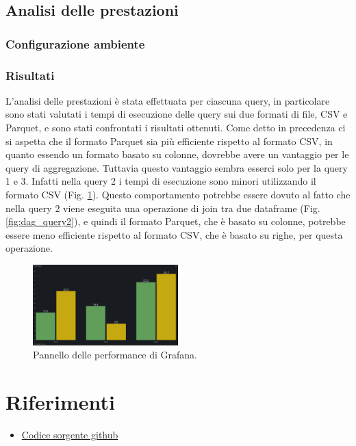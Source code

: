 \documentclass[conference]{IEEEtran}
\begin{document}
\subsection{Analisi delle prestazioni}
\subsubsection{Configurazione ambiente}
\subsubsection{Risultati}
L'analisi delle prestazioni è stata effettuata per ciascuna query, in particolare sono stati valutati i tempi di esecuzione delle query sui due formati di file, CSV e Parquet, e sono stati confrontati i risultati ottenuti.
Come detto in precedenza ci si aspetta che il formato Parquet sia più efficiente rispetto al formato CSV, in quanto essendo un formato basato su colonne, dovrebbe avere un vantaggio per le query di aggregazione.
Tuttavia questo vantaggio sembra esserci solo per la query 1 e 3. Infatti nella query 2 i tempi di esecuzione sono minori utilizzando il formato CSV (Fig. \ref{fig:performance_panel}).
Questo comportamento potrebbe essere dovuto al fatto che nella query 2 viene eseguita una operazione di join tra due dataframe (Fig. \ref{fig:dag_query2}), e quindi il formato Parquet, che è basato su colonne, potrebbe essere meno efficiente rispetto al formato CSV, che è basato su righe, per questa operazione.

\begin{figure}[H]
    \centerline{\includegraphics[width=0.5\textwidth]{res/performance_panel.png}}
    \caption{Pannello delle performance di Grafana.}
    \label{fig:performance_panel}
\end{figure}

\section{Riferimenti}
\begin{itemize}
    \item \href{https://github.com/matteo-conti-97/hard_disk_failure_data_processing}{Codice sorgente github}
\end{itemize}
\vspace{12pt}
\end{document}
